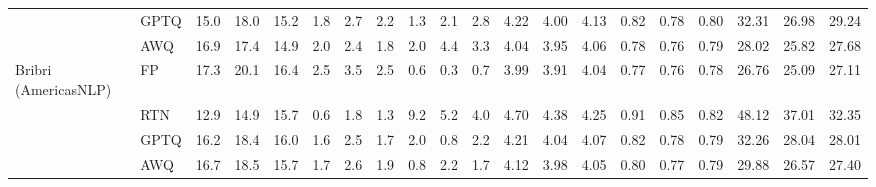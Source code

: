 \begin{landscape}
\begin{longtable}{llrrrrrrrrrrrrrrrrrr}
 & GPTQ & \cellcolor{loss!5}15.0 & \cellcolor{loss!4}18.0 & \cellcolor{loss!2}15.2 & \cellcolor{loss!3}1.8 & \cellcolor{loss!2}2.7 & \cellcolor{loss!1}2.2 & \cellcolor{loss!1}1.3 & \cellcolor{loss!1}2.1 & \cellcolor{loss!3}2.8 & \cellcolor{loss!10}4.22 & \cellcolor{loss!6}4.00 & \cellcolor{loss!3}4.13 & \cellcolor{loss!10}0.82 & \cellcolor{loss!6}0.78 & \cellcolor{loss!2}0.80 & \cellcolor{loss!18}32.31 & \cellcolor{loss!9}26.98 & \cellcolor{loss!5}29.24 \\
 & AWQ & \cellcolor{loss!2}16.9 & \cellcolor{loss!5}17.4 & \cellcolor{loss!2}14.9 & \cellcolor{loss!3}2.0 & \cellcolor{loss!2}2.4 & \cellcolor{loss!1}1.8 & \cellcolor{loss!4}2.0 & \cellcolor{loss!12}4.4 & \cellcolor{loss!5}3.3 & \cellcolor{loss!6}4.04 & \cellcolor{loss!5}3.95 & \cellcolor{loss!1}4.06 & \cellcolor{loss!6}0.78 & \cellcolor{loss!5}0.76 & \cellcolor{loss!1}0.79 & \cellcolor{loss!9}28.02 & \cellcolor{loss!7}25.82 & \cellcolor{loss!2}27.68 \\
\midrule
Bribri (AmericasNLP) & FP & 17.3 & 20.1 & 16.4 & 2.5 & 3.5 & 2.5 & 0.6 & 0.3 & 0.7 & 3.99 & 3.91 & 4.04 & 0.77 & 0.76 & 0.78 & 26.76 & 25.09 & 27.11 \\
 & RTN & \cellcolor{loss!8}12.9 & \cellcolor{loss!9}14.9 & \cellcolor{loss!1}15.7 & \cellcolor{loss!3}0.6 & \cellcolor{loss!3}1.8 & \cellcolor{loss!2}1.3 & \cellcolor{loss!37}9.2 & \cellcolor{loss!21}5.2 & \cellcolor{loss!14}4.0 & \cellcolor{loss!18}4.70 & \cellcolor{loss!12}4.38 & \cellcolor{loss!5}4.25 & \cellcolor{loss!19}0.91 & \cellcolor{loss!12}0.85 & \cellcolor{loss!5}0.82 & \cellcolor{loss!42}48.12 & \cellcolor{loss!23}37.01 & \cellcolor{loss!10}32.35 \\
 & GPTQ & \cellcolor{loss!2}16.2 & \cellcolor{loss!3}18.4 & \cellcolor{loss!1}16.0 & \cellcolor{loss!2}1.6 & \cellcolor{loss!2}2.5 & \cellcolor{loss!1}1.7 & \cellcolor{loss!6}2.0 & \cellcolor{loss!2}0.8 & \cellcolor{loss!7}2.2 & \cellcolor{loss!6}4.21 & \cellcolor{loss!3}4.04 & \cellcolor{loss!1}4.07 & \cellcolor{loss!6}0.82 & \cellcolor{loss!3}0.78 & \cellcolor{loss!1}0.79 & \cellcolor{loss!11}32.26 & \cellcolor{loss!6}28.04 & \cellcolor{loss!2}28.01 \\
 & AWQ & \cellcolor{loss!1}16.7 & \cellcolor{loss!3}18.5 & \cellcolor{loss!1}15.7 & \cellcolor{loss!1}1.7 & \cellcolor{loss!2}2.6 & \cellcolor{loss!1}1.9 & \cellcolor{loss!1}0.8 & \cellcolor{loss!9}2.2 & \cellcolor{loss!4}1.7 & \cellcolor{loss!3}4.12 & \cellcolor{loss!2}3.98 & \cellcolor{loss!0}4.05 & \cellcolor{loss!4}0.80 & \cellcolor{loss!1}0.77 & \cellcolor{loss!1}0.79 & \cellcolor{loss!6}29.88 & \cellcolor{loss!3}26.57 & \cellcolor{loss!1}27.40 \\
\midrule
\end{longtable}
\end{landscape}

